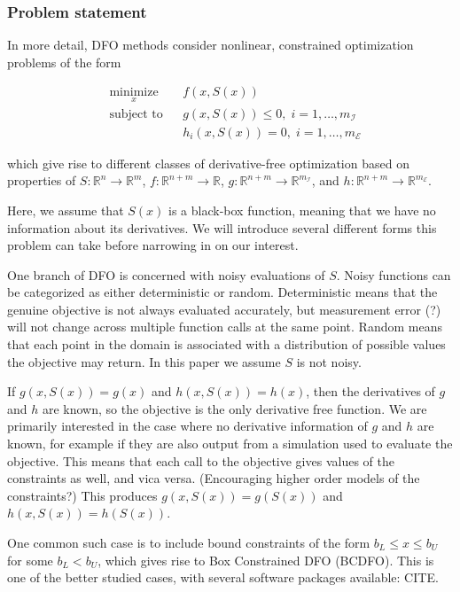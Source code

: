 \documentclass{article}
\begin{document}
\subsubsection{Problem statement}

In more detail, DFO methods consider nonlinear, constrained optimization problems of the form

\begin{equation*}
\begin{aligned}
& \underset{x}{\text{minimize}} & & f(x, S(x)) \\
& \text{subject to} & & g(x, S(x)) \leq 0, \; i = 1, \ldots, m_{\mathcal{I}} \\
& & & h_i(x, S(x)) = 0, \; i = 1, \ldots, m_{\mathcal{E}}
\end{aligned}
\end{equation*}

which give rise to different classes of derivative-free optimization based on properties of
$S : \mathbb{R}^n \to \mathbb{R}^m$,
$f : \mathbb{R}^{n+m} \to \mathbb{R}$,
$g : \mathbb{R}^{n+m} \to \mathbb{R}^{m_{\mathcal{I}}}$, and
$h : \mathbb{R}^{n+m} \to \mathbb{R}^{m_{\mathcal{E}}}$.

Here, we assume that $S(x)$ is a black-box function, meaning that we have no information about its derivatives.
We will introduce several different forms this problem can take before narrowing in on our interest.

One branch of DFO is concerned with noisy evaluations of $S$.
Noisy functions can be categorized as either deterministic or random.
Deterministic means that the genuine objective is not always evaluated accurately, but measurement error (?) will not change across multiple function calls at the same point.
Random means that each point in the domain is associated with a distribution of possible values the objective may return.
In this paper we assume $S$ is not noisy.

If $g(x, S(x)) = g(x)$ and $h(x, S(x)) = h(x)$, then the derivatives of $g$ and $h$ are known, so the objective is the only derivative free function.
We are primarily interested in the case where no derivative information of $g$ and $h$ are known, for example if they are also output from a simulation used to evaluate the objective.
This means that each call to the objective gives values of the constraints as well, and vica versa.
(Encouraging higher order models of the constraints?)
This produces $g(x, S(x))=g(S(x))$ and $h(x,S(x))=h(S(x))$.

One common such case is to include bound constraints of the form $b_{L} \le x \le b_{U}$ for some $b_{L} < b_{U}$, which gives rise to Box Constrained DFO (BCDFO).
This is one of the better studied cases, with several software packages available: CITE.
\end{document}
